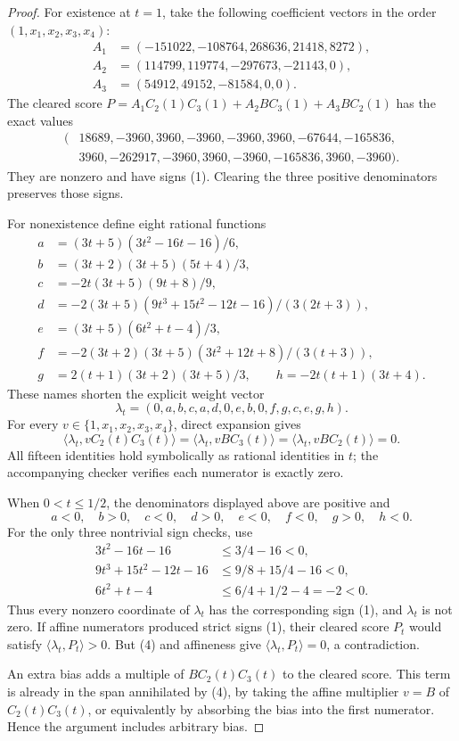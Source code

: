 \documentclass[11pt]{article}
\begin{document}
\begin{proof}
For existence at $t=1$, take the following coefficient vectors in the
order $(1,x_1,x_2,x_3,x_4)$:
\[
 \begin{aligned}
 A_1&=(-151022,-108764,268636,21418,8272),\\
 A_2&=(114799,119774,-297673,-21143,0),\\
 A_3&=(54912,49152,-81584,0,0).
 \end{aligned}
\]
The cleared score $P=A_1C_2(1)C_3(1)+A_2BC_3(1)+A_3BC_2(1)$ has
the exact values
\[
 \begin{split}
 (&18689,-3960,3960,-3960,-3960,3960,-67644,-165836,\\
  &3960,-262917,-3960,3960,-3960,-165836,3960,-3960).
 \end{split}                                                     \tag{2}
\]
They are nonzero and have signs (1). Clearing the three positive
denominators preserves those signs.

For nonexistence define eight rational functions
\[
 \begin{aligned}
 a&=(3t+5)(3t^2-16t-16)/6,\\
 b&=(3t+2)(3t+5)(5t+4)/3,\\
 c&=-2t(3t+5)(9t+8)/9,\\
 d&=-2(3t+5)(9t^3+15t^2-12t-16)/(3(2t+3)),\\
 e&=(3t+5)(6t^2+t-4)/3,\\
 f&=-2(3t+2)(3t+5)(3t^2+12t+8)/(3(t+3)),\\
 g&=2(t+1)(3t+2)(3t+5)/3,
 \qquad h=-2t(t+1)(3t+4).
 \end{aligned}
\]
These names shorten the explicit weight vector
\[
 \lambda_t=(0,a,b,c,a,d,0,e,b,0,f,g,c,e,g,h).             \tag{3}
\]
For every $v\in\{1,x_1,x_2,x_3,x_4\}$, direct expansion gives
\[
 \langle\lambda_t,vC_2(t)C_3(t)\rangle
 =\langle\lambda_t,vBC_3(t)\rangle
 =\langle\lambda_t,vBC_2(t)\rangle=0.                  \tag{4}
\]
All fifteen identities hold symbolically as rational identities in
$t$; the accompanying checker verifies each numerator is exactly zero.

When $0<t\leq1/2$, the denominators displayed above are positive and
\[
 a<0,\quad b>0,\quad c<0,\quad d>0,\quad e<0,
 \quad f<0,\quad g>0,\quad h<0.
\]
For the only three nontrivial sign checks, use
\[
 \begin{aligned}
 3t^2-16t-16&\leq3/4-16<0,\\
 9t^3+15t^2-12t-16&\leq9/8+15/4-16<0,\\
 6t^2+t-4&\leq6/4+1/2-4=-2<0.
 \end{aligned}
\]
Thus every nonzero coordinate of $\lambda_t$ has the corresponding
sign (1), and $\lambda_t$ is not zero. If affine numerators produced
strict signs (1), their cleared score $P_t$ would satisfy
$\langle\lambda_t,P_t\rangle>0$. But (4) and affineness give
$\langle\lambda_t,P_t\rangle=0$, a contradiction.

An extra bias adds a multiple of $BC_2(t)C_3(t)$ to the cleared
score. This term is already in the span annihilated by (4), by taking
the affine multiplier $v=B$ of $C_2(t)C_3(t)$, or equivalently by
absorbing the bias into the first numerator. Hence the argument
includes arbitrary bias.
\end{proof}
\end{document}
